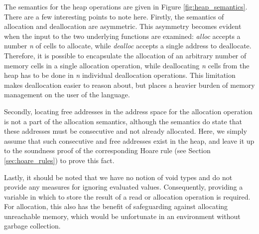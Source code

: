 The semantics for the heap operations are given in Figure \ref{fig:heap_semantics}. There are a few interesting points to note here. Firstly, the semantics of allocation and deallocation are asymmetric. This asymmetry becomes evident when the input to the two underlying functions are examined: {\it alloc} accepts a number {\it n} of cells to allocate, while {\it dealloc} accepts a single address to deallocate. Therefore, it is possible to encapsulate the allocation of an arbitrary number of memory cells in a single allocation operation, while deallocating {\it n} cells from the heap has to be done in {\it n} individual deallocation operations. This limitation makes deallocation easier to reason about, but places a heavier burden of memory management on the user of the language.

Secondly, locating free addresses in the address space for the allocation operation is not a part of the allocation semantics, although the semantics do state that these addresses must be consecutive and   not already allocated.  Here, we simply assume that such consecutive and free addresses exist in the heap, and leave it up to the soundness proof of the corresponding Hoare rule (see Section \ref{sec:hoare_rules}) to prove this fact.

Lastly, it should be noted that we have no notion of void types and do not provide any measures for ignoring evaluated values. Consequently, providing a variable in which to store the result of a read or allocation operation is required. For allocation, this also has the benefit of safeguarding against allocating unreachable memory, which would be unfortunate in an environment without garbage collection.


